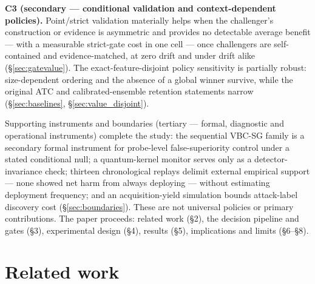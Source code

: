 \documentclass[a4paper,fleqn]{cas-sc}
\begin{document}
\textbf{C3 (secondary --- conditional validation and context-dependent policies).} Point/strict validation materially helps when the challenger's construction or evidence is asymmetric and provides no detectable average benefit --- with a measurable strict-gate cost in one cell --- once challengers are self-contained and evidence-matched, at zero drift and under drift alike (\S\ref{sec:gatevalue}). The exact-feature-disjoint policy sensitivity is partially robust: size-dependent ordering and the absence of a global winner survive, while the original ATC and calibrated-ensemble retention statements narrow (\S\ref{sec:baselines}, \S\ref{sec:value_disjoint}).

Supporting instruments and boundaries (tertiary --- formal, diagnostic and operational instruments) complete the study: the sequential VBC-SG family is a secondary formal instrument for probe-level false-superiority control under a stated conditional null; a quantum-kernel monitor serves only as a detector-invariance check; thirteen chronological replays delimit external empirical support --- none showed net harm from always deploying --- without estimating deployment frequency; and an acquisition-yield simulation bounds attack-label discovery cost (\S\ref{sec:boundaries}). These are not universal policies or primary contributions. The paper proceeds: related work (\S2), the decision pipeline and gates (\S3), experimental design (\S4), results (\S5), implications and limits (\S6--\S8).


\section{Related work}
\end{document}
